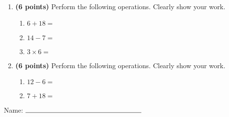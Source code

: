 \documentclass[12pt]{amsart}
\begin{document}
\newpage
\begin{enumerate}
\item {\bf (6 points)} 
 Perform the following operations. Clearly show your work. \begin{enumerate}


\def \a{6}\def \b{18}\def \apb{24}

 
\item $\a + \b = $

\vspace{2cm}
\def \a{14}\def \dif{7}\def \b{7}

 
\item $\a - \b = $

\vspace{2cm}
\def \a{3}\def \b{6}\def \ab{9}

 
\item $\a \times \b = $ 

\vspace{2cm}
\def \vshift{3}\def \hshift{2}\def \chang{-1}\def \findval{1}\def \yval{5}

 
\end{enumerate}


\newpage
\item {\bf (6 points)} 
 Perform the following operations. Clearly show your work. \begin{enumerate}


\def \a{12}\def \dif{6}\def \b{6}

 
\item $\a - \b = $

\vspace{2cm}
\def \a{7}\def \b{18}\def \apb{25}

 
\item $\a + \b = $

\vspace{2cm}
\def \vshift{-3}\def \hshift{2}\def \chang{-2}\def \findval{0}\def \yval{1}

 
\end{enumerate}


\newpage\end{enumerate}\graphicspath{{/Users/jilan/Downloads/Randomizer/Randomizer/Sample Course/Sample Assessment 2/}}\setcounter{page}{1}


\thispagestyle{fancy}

 
\noindent Name: $\rule{6cm}{0.15mm}$

\vspace{.2cm}
\end{document}

